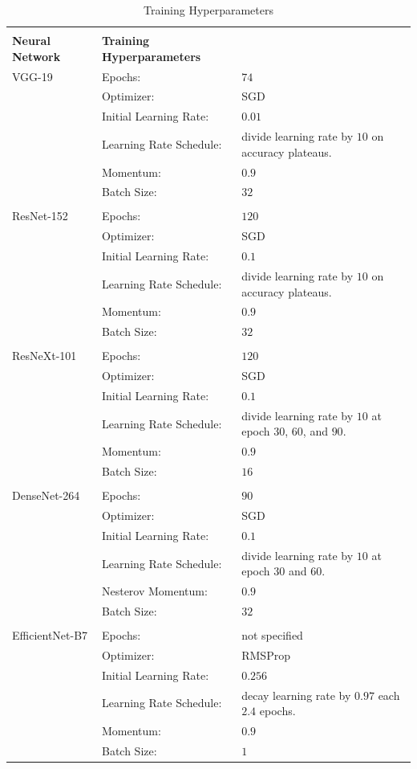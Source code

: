 \begin{xltabular}{\textwidth}{llX}\toprule
	\caption[Training Hyperparameters]{Training Hyperparameters \autocites{Simonyan.2014}{He.2016}{Xie.2017}{Huang.2017}{Tan.2019}} \label{tab:hyperparams}\\
	\textbf{Neural Network} & \textbf{Training Hyperparameters} & \\\midrule \endhead
	VGG-19 & Epochs: & $74$\\
		& Optimizer: & \ac{SGD}\\
		& Initial Learning Rate: & $0.01$\\
		& Learning Rate Schedule: & divide learning rate by $10$ on accuracy plateaus.\\
		& Momentum: & $0.9$\\
		& Batch Size: & $32$\\
	\\\midrule
	ResNet-152 & Epochs: & $120$\\
		& Optimizer: & \ac{SGD}\\
		& Initial Learning Rate: & $0.1$\\
		& Learning Rate Schedule: & divide learning rate by $10$ on accuracy plateaus.\\
		& Momentum: & $0.9$\\ 
		& Batch Size: & $32$\\
	\\\midrule
	ResNeXt-101 & Epochs: & $120$\\
		& Optimizer: & \ac{SGD}\\
		& Initial Learning Rate: & $0.1$\\
		& Learning Rate Schedule: & divide learning rate by $10$ at epoch $30$, $60$, and $90$.\\
		& Momentum: & $0.9$\\ 
		& Batch Size: & $16$\\
	\\\midrule
	DenseNet-264 & Epochs: & $90$\\
		& Optimizer: & \ac{SGD}\\
		& Initial Learning Rate: & $0.1$\\
		& Learning Rate Schedule: & divide learning rate by $10$ at epoch $30$ and $60$.\\
		& Nesterov Momentum: & $0.9$\\
		& Batch Size: & $32$\\
	\\\midrule
	EfficientNet-B7 & Epochs: & not specified\\
		& Optimizer: & \ac{RMSProp}\\
		& Initial Learning Rate: & $0.256$\\
		& Learning Rate Schedule: & decay learning rate by $0.97$ each $2.4$ epochs.\\
		& Momentum: & $0.9$\\
		& Batch Size: & $1$
	\\\bottomrule
\end{xltabular}
